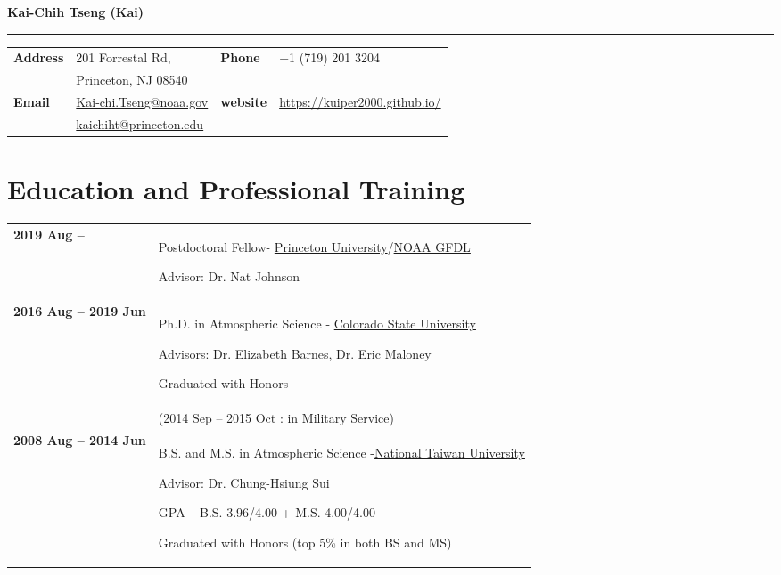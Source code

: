 \documentclass{article}
\begin{document}
{\huge\color{airforceblue}\textbf{Kai-Chih Tseng (Kai)}\par}
\rule{\textwidth}{0.5mm}\par

\vspace{5ex}

\begin{tabular}{
		>{\bfseries}p{.20\linewidth}
		p{.4\linewidth}
		>{\bfseries}p{.1\linewidth}
		p{.25\linewidth}
	}
	Address       & 201 Forrestal Rd,          &  Phone  & +1 (719) 201 3204 \\
	              & Princeton, NJ 08540          &    &  \\
	Email         & \href{mailto:Kai-chi.Tseng@noaa.gov}{Kai-chi.Tseng@noaa.gov} & website & \href{https://kuiper2000.github.io/}{https://kuiper2000.github.io/}    \\
                  & \href{mailto:kaichiht@princeton.edu}{kaichiht@princeton.edu} &       &     \\
\end{tabular}

\section{\color{airforceblue}Education and Professional Training}
\begin{tabular}{>{\bfseries}p{4cm}p{\linewidth-2.5cm\relax}}
	2019  Aug --   & Postdoctoral Fellow- \href{https://www.princeton.edu/}{Princeton University}/\href{https://www.gfdl.noaa.gov/}{NOAA GFDL}\par
	Advisor: Dr. Nat Johnson \par
    \\
	2016  Aug -- 2019 Jun & Ph.D. in Atmospheric Science -
	\href{https://www.colostate.edu/}{Colorado State University}\par
	Advisors: Dr. Elizabeth Barnes, Dr. Eric Maloney \par
	Graduated with Honors \par
	\\
	 & (2014 Sep -- 2015 Oct : in Military Service) \par
	\\
	2008 Aug -- 2014 Jun & B.S. and M.S. in Atmospheric Science -\href{https://www.ntu.edu.tw/}{National Taiwan University}\par
	Advisor: Dr. Chung-Hsiung Sui \par
	GPA -- B.S. 3.96/4.00 + M.S. 4.00/4.00  \par
	Graduated with Honors (top 5\% in both BS and MS) \par
	

\end{tabular}
\end{document}
